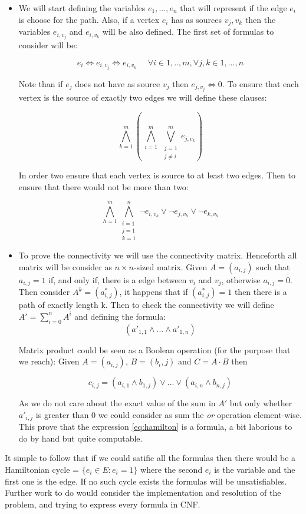 \begin{itemize}
\item We will start defining the variables $e_1,...,e_n$ that will represent if the edge $e_i$ is choose for the path. Also, if a vertex $e_i$ has as sources $v_j,v_k$ then the variables $e_{i,v_j}$ and $e_{i,v_k}$ will be also defined. The first set of formulas to consider will be:

  $$
	e_i \iff e_{i,v_j} \iff e_{i,v_k} \ \ \ \ \ \   \forall i \in 1,..,m, \forall j,k \in 1,...,n 
  $$

  Note than if $e_j$ does not have as source $v_j$ then $e_{j,v_j} \iff 0$. To ensure that each vertex is the source of exactly two edges we will define these clauses:

  $$
	\bigwedge_{k=1}^m \left (\ \bigwedge_{i=1}^m \  \bigvee_{\substack{j=1\\  j\ne i}}^m e_{j,v_k} \right )
  $$

  In order two ensure that each vertex is source to at least two edges. Then to ensure that there would not be more than two:

  $$
	\bigwedge_{h=1}^m \bigwedge_{\substack{i=1\\j=1\\k=1}}^n \neg e_{i,v_h} \vee \neg e_{j,v_h} \vee \neg e_{k,v_h} 
  $$

\item To prove the connectivity we will use the connectivity matrix. Henceforth all matrix will be consider as $n\times n$-sized matrix. Given $A = (a_{i,j})$ such that $a_{i,j} = 1$ if, and only if, there is a edge between $v_i$ and $v_j$, otherwise $a_{i,j} = 0 $. Then consider $A^{k} = (a^*_{i,j})$, it happens that if $(a^*_{i,j})=1$ then there is a path of exactly length k. Then to check the connectivity we will define $A' = \sum_{i=0}^n A^i$ and defining the formula:\\
\begin{equation} \label{eq:hamilton}
  (a'_{1,1}\wedge ... \wedge a'_{1,n})  
\end{equation}

  Matrix product could be seen as a Boolean operation (for the purpose that we reach): Given $A = (a_{i,j})$, $B = (b_i,j)$ and $C=A\cdot B$ then 

  $$
	c_{i,j} = (a_{i,1}\wedge b_{1,j}) \vee ... \vee (a_{i,n}\wedge b_{n,j})
  $$

  As we do not care about the exact value of the sum in $A'$ but only whether $a'_{i,j}$ is greater than 0 we could consider as sum the \emph{or} operation element-wise. This prove that the expression \ref{eq:hamilton} is a formula, a bit laborious to do by hand but quite computable.  

\end{itemize}
It simple to follow that if we could satifie all the formulas then there would be a Hamiltonian cycle = $\{e_i\in E : e_i = 1\}$ where the second $e_i$ is the variable and the first one is the edge. If no such cycle exists the formulas will be unsatisfiables. Further work to do would consider the implementation and resolution of the problem, and trying to express every formula in CNF.


